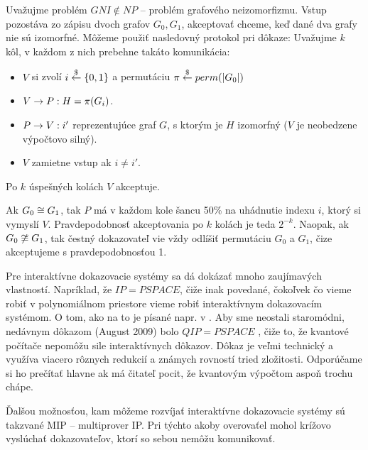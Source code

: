 \begin{priklad}
    Uvažujme problém $GNI \not \in NP$ -- problém grafového neizomorfizmu.
    Vstup pozostáva zo zápisu dvoch grafov $G_0, G_1$, akceptovať chceme, keď
    dané dva grafy nie sú izomorfné. Môžeme použiť nasledovný protokol
    pri dôkaze: Uvažujme $k$ kôl, v každom z nich prebehne takáto
    komunikácia:
    \begin{itemize}
        \item $V$ si zvolí $i \overset{\$}{\leftarrow} \{0,1\}$ a permutáciu
         $\pi \overset{\$}{\leftarrow} perm(|G_0|)$
        \item $V \rightarrow P: H = \pi(G_i)$.
        \item $P \rightarrow V: i'$ reprezentujúce graf $G$, s ktorým je $H$
        izomorfný ($V$ je neobedzene výpočtovo silný).
        \item $V$ zamietne vstup ak $i \not = i'$.
    \end{itemize}
    Po $k$ úspešných kolách $V$ akceptuje.

    Ak $G_0 \cong G_1$, tak $P$ má v každom kole šancu 50\% na
    uhádnutie indexu $i$, ktorý si vymyslí $V$. 
    Pravdepodobnosť akceptovania po $k$ kolách je teda $2^{-k}$.
    Naopak, ak $G_0 \not \cong G_1$, tak čestný dokazovateľ vie
    vždy odlíšiť permutáciu $G_0$ a $G_1$,
    čize akceptujeme s pravdepodobnosťou 1.
\end{priklad}

Pre interaktívne dokazovacie systémy sa dá dokázať mnoho zaujímavých
vlastností. Napríklad, že $IP=PSPACE$,
čiže inak povedané, čokoľvek čo
vieme robiť v polynomiálnom priestore vieme robiť interaktívnym
dokazovacím systémom. O tom, ako na to je písané napr. v
\cite{ip-pspace}. Aby sme neostali staromódni, nedávnym dôkazom
(August 2009) bolo $QIP=PSPACE$ \cite{qip-pspace}, čiže to,
že kvantové počítače nepomôžu sile interaktívnych dôkazov.
Dôkaz je veľmi technický a využíva viacero rôznych redukcií a známych
rovností tried zložitosti. Odporúčame si ho prečítať hlavne ak má
čitateľ pocit, že kvantovým výpočtom aspoň trochu chápe.

Ďalšou možnosťou, kam môžeme rozvíjať interaktívne dokazovacie systémy
sú takzvané MIP -- multiprover IP. Pri týchto akoby overovaťel mohol
krížovo vyslúchať dokazovateľov, ktorí so sebou nemôžu komunikovať.
